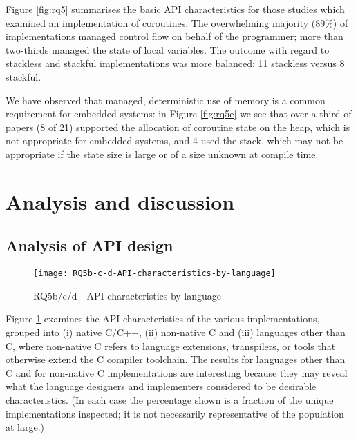 Figure \ref{fig:rq5} summarises the basic API characteristics for those studies which examined an implementation of coroutines. The overwhelming majority (89\%) of implementations managed control flow on behalf of the programmer; more than two-thirds managed the state of local variables. The outcome with regard to stackless and stackful implementations was more balanced: 11 stackless versus 8 stackful.

We have observed that managed, deterministic use of memory is a common requirement for embedded systems: in Figure \ref{fig:rq5e} we see that over a third of papers (8 of 21) supported the allocation of coroutine state on the heap, which is not appropriate for embedded systems, and 4 used the stack, which may not be appropriate if the state size is large or of a size unknown at compile time.

\section{Analysis and discussion}
\label{section:analysis}

\subsection{Analysis of API design}
\label{analysis-of-api-design}

\begin{figure}[h]
	\texttt{[image: RQ5b-c-d-API-characteristics-by-language]}
	\caption{RQ5b/c/d - API characteristics by language}
	\label{fig:rq5bcd}
\end{figure}

%		

Figure \ref{fig:rq5bcd} examines the API characteristics of the various implementations, grouped into (i) native C/C++, (ii) non-native C and (iii) languages other than C, where non-native C refers to language extensions, transpilers, or tools that otherwise extend the C compiler toolchain. The results for languages other than C and for non-native C implementations are interesting because they may reveal what the language designers and implementers considered to be desirable characteristics. (In each case the percentage shown is a fraction of the unique implementations inspected; it is not necessarily representative of the population at large.)


